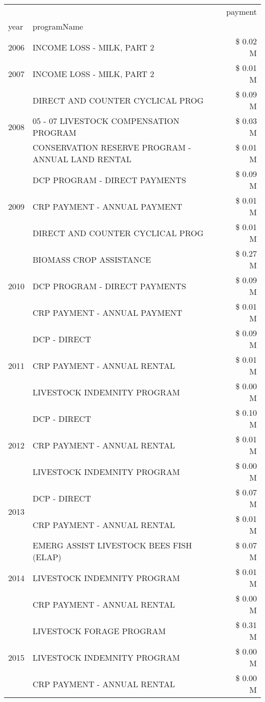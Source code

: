 \begin{tabular}{llr}
\toprule
 &  & payment \\
year & programName &  \\
\midrule
2006 & INCOME LOSS - MILK, PART 2 & \$ 0.02 M \\
\cline{1-3}
2007 & INCOME LOSS - MILK, PART 2 & \$ 0.01 M \\
\cline{1-3}
\multirow[t]{3}{*}{2008} & DIRECT AND COUNTER CYCLICAL PROG & \$ 0.09 M \\
 & 05 - 07 LIVESTOCK COMPENSATION PROGRAM & \$ 0.03 M \\
 & CONSERVATION RESERVE PROGRAM - ANNUAL LAND RENTAL & \$ 0.01 M \\
\cline{1-3}
\multirow[t]{3}{*}{2009} & DCP PROGRAM - DIRECT PAYMENTS & \$ 0.09 M \\
 & CRP PAYMENT - ANNUAL PAYMENT & \$ 0.01 M \\
 & DIRECT AND COUNTER CYCLICAL PROG & \$ 0.01 M \\
\cline{1-3}
\multirow[t]{3}{*}{2010} & BIOMASS CROP ASSISTANCE & \$ 0.27 M \\
 & DCP PROGRAM - DIRECT PAYMENTS & \$ 0.09 M \\
 & CRP PAYMENT - ANNUAL PAYMENT & \$ 0.01 M \\
\cline{1-3}
\multirow[t]{3}{*}{2011} & DCP - DIRECT & \$ 0.09 M \\
 & CRP PAYMENT - ANNUAL RENTAL & \$ 0.01 M \\
 & LIVESTOCK INDEMNITY PROGRAM & \$ 0.00 M \\
\cline{1-3}
\multirow[t]{3}{*}{2012} & DCP - DIRECT & \$ 0.10 M \\
 & CRP PAYMENT - ANNUAL RENTAL & \$ 0.01 M \\
 & LIVESTOCK INDEMNITY PROGRAM & \$ 0.00 M \\
\cline{1-3}
\multirow[t]{2}{*}{2013} & DCP - DIRECT & \$ 0.07 M \\
 & CRP PAYMENT - ANNUAL RENTAL & \$ 0.01 M \\
\cline{1-3}
\multirow[t]{3}{*}{2014} & EMERG ASSIST LIVESTOCK BEES FISH (ELAP) & \$ 0.07 M \\
 & LIVESTOCK INDEMNITY PROGRAM & \$ 0.01 M \\
 & CRP PAYMENT - ANNUAL RENTAL & \$ 0.00 M \\
\cline{1-3}
\multirow[t]{3}{*}{2015} & LIVESTOCK FORAGE PROGRAM & \$ 0.31 M \\
 & LIVESTOCK INDEMNITY PROGRAM & \$ 0.00 M \\
 & CRP PAYMENT - ANNUAL RENTAL & \$ 0.00 M \\

\end{tabular}
